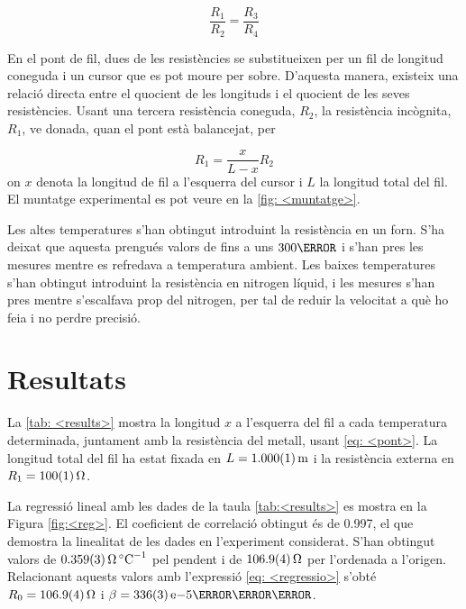 \begin{equation}
\frac{R_1}{R_2}=\frac{R_3}{R_4}
\end{equation} 

En el pont de fil, dues de les resistències se substitueixen per un fil de longitud coneguda i un cursor que es pot moure per sobre. D'aquesta manera, existeix una relació directa entre el quocient de les longituds i el quocient de les seves resistències. Usant una tercera resistència coneguda, $R_2$, la resistència incògnita, $R_1$, ve donada, quan el pont està balancejat, per

\begin{equation}\label{eq: <pont>}
R_1=\frac{x}{L-x}R_2
\end{equation}
on $x$ denota la longitud de fil a l'esquerra del cursor i $L$ la longitud total del fil. El muntatge experimental es pot veure en la \ref{fig: <muntatge>}. 

Les altes temperatures s'han obtingut introduint la resistència en un forn. S'ha deixat que aquesta prengués valors de fins a uns $\si{300}{\celsius}$ i s'han pres les mesures mentre es refredava a temperatura ambient. Les baixes temperatures s'han obtingut introduint la resistència en nitrogen líquid, i les mesures s'han pres mentre s'escalfava prop del nitrogen, per tal de reduir la velocitat a què ho feia i no perdre precisió.


\section{Resultats}

La \ref{tab: <results>} mostra la longitud $x$ a l'esquerra del fil a cada temperatura determinada, juntament amb la resistència del metall, usant \ref{eq: <pont>}. La longitud total del fil ha estat fixada en $L=\data{1.000}{0.001}{\meter}$ i la resistència externa en $R_1=\data{100}{1}{\ohm}$.

La regressió lineal amb les dades de la taula \cref{tab:<results>} es mostra en la Figura \ref{fig:<reg>}. El coeficient de correlació obtingut és de 0.997, el que demostra la linealitat de les dades en l'experiment considerat. S'han obtingut valors de $\data{0.359}{0.003}{\ohm\per\celsius}$ pel pendent i de $\data{106.9}{0.4}{\ohm}$ per l'ordenada a l'origen. Relacionant aquests valors amb l'expressió \cref{eq: <regressio>} s'obté $R_0=\data{106.9}{0.4}{\ohm}$ i $\beta=\data{336}{3}e{-5}{\ohm\per\celsius}$.

